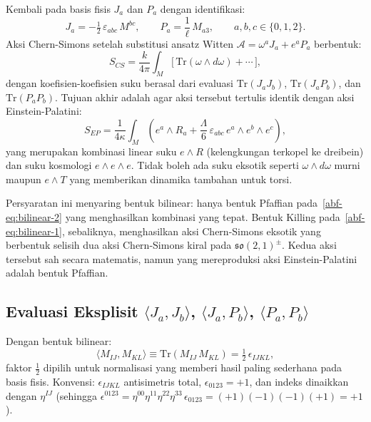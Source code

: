 Kembali pada basis fisis $J_a$ dan $P_a$ dengan identifikasi:
\begin{equation}\label{abf-eq:JaPa-recall}
    J_a = -\tfrac{1}{2}\,\varepsilon_{abc}\,M^{bc}, \qquad P_a = \frac{1}{\ell}\,M_{a3}, \qquad a, b, c \in \{0, 1, 2\}.
\end{equation}
Aksi Chern-Simons setelah substitusi ansatz Witten $\mathcal{A} = \omega^a J_a + e^a P_a$ berbentuk:
\begin{equation}\label{abf-eq:CS-general}
    S_{CS} = \frac{k}{4\pi}\int_M \big[\,\mathrm{Tr}(\omega \wedge d\omega) + \cdots\,\big],
\end{equation}
dengan koefisien-koefisien suku berasal dari evaluasi $\mathrm{Tr}(J_a J_b)$, $\mathrm{Tr}(J_a P_b)$, dan $\mathrm{Tr}(P_a P_b)$. Tujuan akhir adalah agar aksi tersebut tertulis identik dengan aksi Einstein-Palatini:
\begin{equation}\label{abf-eq:EP-target}
    S_{EP} = \frac{1}{4\kappa}\int_M \left(e^a \wedge R_a + \frac{\Lambda}{6}\,\varepsilon_{abc}\,e^a \wedge e^b \wedge e^c\right),
\end{equation}
yang merupakan kombinasi linear suku $e \wedge R$ (kelengkungan terkopel ke dreibein) dan suku kosmologi $e \wedge e \wedge e$. Tidak boleh ada suku eksotik seperti $\omega \wedge d\omega$ murni maupun $e \wedge T$ yang memberikan dinamika tambahan untuk torsi.

Persyaratan ini menyaring bentuk bilinear: hanya bentuk Pfaffian pada~\eqref{abf-eq:bilinear-2} yang menghasilkan kombinasi yang tepat. Bentuk Killing pada~\eqref{abf-eq:bilinear-1}, sebaliknya, menghasilkan aksi Chern-Simons eksotik yang berbentuk selisih dua aksi Chern-Simons kiral pada $\mathfrak{so}(2,1)^\pm$. Kedua aksi tersebut sah secara matematis, namun yang mereproduksi aksi Einstein-Palatini adalah bentuk Pfaffian.

\subsection{Evaluasi Eksplisit $\langle J_a, J_b\rangle$, $\langle J_a, P_b\rangle$, $\langle P_a, P_b\rangle$}
\label{app:bilinear-eval}

Dengan bentuk bilinear:
\begin{equation}\label{abf-eq:bilinear-Pfaff}
    \langle M_{IJ}, M_{KL}\rangle \equiv \mathrm{Tr}(M_{IJ}\,M_{KL}) = \tfrac{1}{2}\,\epsilon_{IJKL},
\end{equation}
faktor $\frac{1}{2}$ dipilih untuk normalisasi yang memberi hasil paling sederhana pada basis fisis. Konvensi: $\epsilon_{IJKL}$ antisimetris total, $\epsilon_{0123} = +1$, dan indeks dinaikkan dengan $\eta^{IJ}$ (sehingga $\epsilon^{0123} = \eta^{00}\eta^{11}\eta^{22}\eta^{33}\,\epsilon_{0123} = (+1)(-1)(-1)(+1) = +1$).

